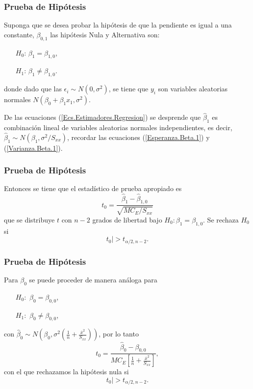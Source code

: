\documentclass{beamer}
\begin{document}
\begin{frame}\frametitle{Prueba de Hip\'otesis}
Suponga que se desea probar la hip\'otesis de que la pendiente es igual a una constante, $\beta_{0,1}$ las hip\'otesis Nula y Alternativa son:
\begin{centering}
\begin{itemize}
\item[$H_{0}$: ] $\beta_{1}=\beta_{1,0}$,

\item[$H_{1}$: ]$\beta_{1}\neq\beta_{1,0}$.

\end{itemize}
donde dado que las $\epsilon_{i} \sim N\left(0,\sigma^{2}\right)$, se tiene que $y_{i}$ son variables aleatorias normales $N\left(\beta_{0}+\beta_{1}x_{1},\sigma^{2}\right)$. 
\end{centering}
De las ecuaciones (\ref{Ecs.Estimadores.Regresion}) se desprende que $\hat{\beta}_{1}$ es combinaci\'on lineal de variables aleatorias normales independientes, es decir, $\hat{\beta}_{1}\sim N\left(\beta_{1},\sigma^{2}/S_{xx}\right)$, recordar las ecuaciones (\ref{Esperanza.Beta.1}) y (\ref{Varianza.Beta.1}).
\end{frame}

\begin{frame}\frametitle{Prueba de Hip\'otesis}
Entonces se tiene que el estad\'istico de prueba apropiado es
\begin{equation}\label{Estadistico.Beta.1}
t_{0}=\frac{\hat{\beta}_{1}-\hat{\beta}_{1,0}}{\sqrt{MC_{E}/S_{xx}}}
\end{equation}
que se distribuye $t$ con $n-2$ grados de libertad bajo $H_{0}:\beta_{1}=\beta_{1,0}$. Se rechaza $H_{0}$ si 
\begin{equation}\label{Zona.Rechazo.Beta.1}
t_{0}|>t_{\alpha/2,n-2}.
\end{equation}

\end{frame}

\begin{frame}\frametitle{Prueba de Hip\'otesis}
Para $\beta_{0}$ se puede proceder de manera an\'aloga para
\begin{itemize}
\item[$H_{0}:$] $\beta_{0}=\beta_{0,0}$,
\item[$H_{1}:$] $\beta_{0}\neq\beta_{0,0}$,
\end{itemize}
con $\hat{\beta}_{0}\sim N\left(\beta_{0},\sigma^{2}\left(\frac{1}{n}+\frac{\overline{x}^{2}}{S_{xx}}\right)\right)$, por lo tanto
\begin{equation}\label{Estadistico.Beta.0}
t_{0}=\frac{\hat{\beta}_{0}-\beta_{0,0}}{MC_{E}\left[\frac{1}{n}+\frac{\overline{x}^{2}}{S_{xx}}\right]},
\end{equation}
con el que rechazamos la hip\'otesis nula si
\begin{equation}\label{Zona.Rechazo.Beta.0}
t_{0}|>t_{\alpha/2,n-2}.
\end{equation}

\end{frame}
\end{document}
